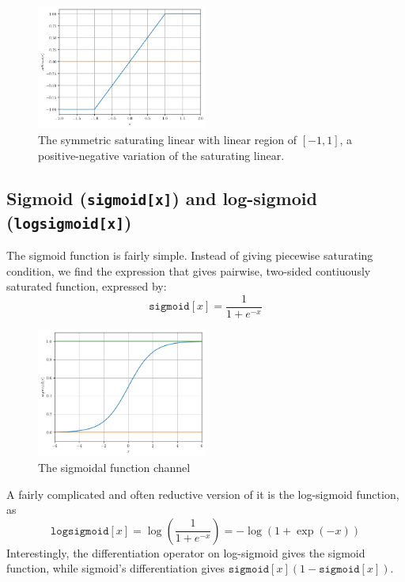 \begin{figure}[h!]
    \centering
    \includegraphics[width=0.5\textwidth]{img/symsatlins.png}
    \caption{The symmetric saturating linear with linear region of $[-1,1]$, a positive-negative variation of the saturating linear.}
\end{figure}
\subsection{Sigmoid (\texttt{sigmoid[x]}) and log-sigmoid (\texttt{logsigmoid[x]})}
The sigmoid function is fairly simple. Instead of giving piecewise saturating condition, we find the expression that gives pairwise, two-sided contiuously saturated function, expressed by: 
\begin{equation}
    \texttt{sigmoid}[x] = \frac{1}{1+ e^{-x}}
\end{equation}
\begin{figure}[h!]
    \centering
    \includegraphics[width=0.5\textwidth]{img/sigmoid.png}
    \caption{The sigmoidal function channel}
\end{figure}
A fairly complicated and often reductive version of it is the log-sigmoid function, as
\begin{equation}
    \texttt{logsigmoid}[x] = \log{\left(\frac{1}{1+ e^{-x}}\right)} = -\log{(1+ \exp{(-x)})}
\end{equation}
Interestingly, the differentiation operator on log-sigmoid gives the sigmoid function, while sigmoid's differentiation gives $\texttt{sigmoid}[x](1-\texttt{sigmoid}[x])$. 
